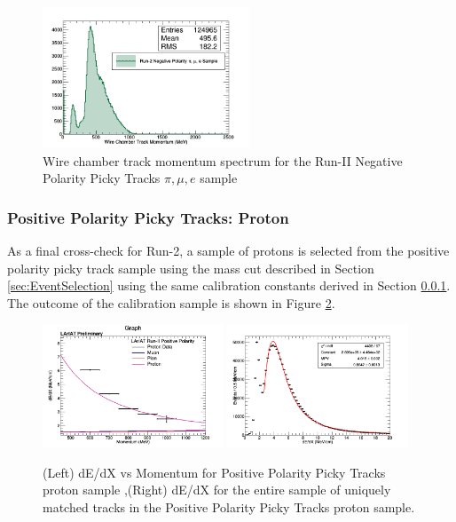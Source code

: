 \begin{figure}[htb]
\centering
\includegraphics[width=0.55\textwidth]{images/WCTrkMomentumRun2NegPiMuE.png}
\caption{Wire chamber track momentum spectrum for the Run-II Negative Polarity Picky Tracks $\pi, \mu, e$ sample  }
\label{fig:Run2NegPickyTrkPiMuEMomentumSpec}
\end{figure}


\subsubsection{Positive Polarity Picky Tracks: Proton}\label{sec:Run2PosPickyTrkPiMuE}

As a final cross-check for Run-2, a sample of protons is selected from the positive polarity picky track sample using the mass cut described in Section \ref{sec:EventSelection} using the same calibration constants derived in Section \ref{sec:Run2PosPickyTrkPiMuE}. The outcome of the calibration sample is shown in Figure \ref{fig:Run2PosPickyTrkProtonResults}.

\begin{figure}[htb]
\centering
\includegraphics[width=0.48\textwidth]{images/dEdXvsMomentumPosPolRun2ProtonFineBin.png}
\includegraphics[width=0.48\textwidth]{images/dEdXPosPolRun2Proton.png}
\caption{(Left) dE/dX vs Momentum for Positive Polarity Picky Tracks proton sample ,(Right) dE/dX for the entire sample of uniquely matched tracks in the Positive Polarity Picky Tracks proton sample.}
\label{fig:Run2PosPickyTrkProtonResults}
\end{figure}

